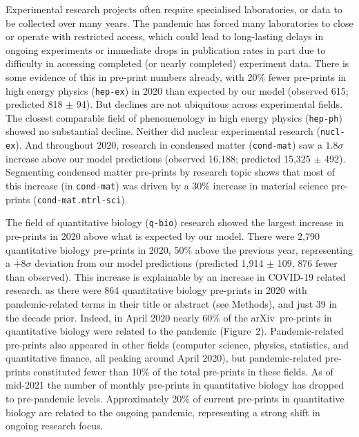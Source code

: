 \documentclass[a4paper,12pt]{article}
\newcommand{\arxiv}{arXiv}
\renewcommand*{\thefootnote}{\arabic{footnote}}
\begin{document}
Experimental research projects often require specialised laboratories, or data to be collected over many years. The pandemic has forced many laboratories to close or operate with restricted access\cite{PhysicsWorld,ScienceMag}, which could lead to long-lasting delays in ongoing experiments or immediate drops in publication rates in part due to difficulty in accessing completed (or nearly completed) experiment data. There is some evidence of this in pre-print numbers already, with {20\%} fewer pre-prints in high energy physics (\texttt{hep-ex}) in 2020 than expected by our model (observed 615; predicted 818 $\pm$ 94). But declines are not ubiquitous across experimental fields. The closest comparable field of phenomenology in high energy physics (\texttt{hep-ph}) showed no substantial decline. Neither did nuclear experimental research (\texttt{nucl-ex}). And throughout 2020, research in condensed matter (\texttt{cond-mat}) saw a $1.8\sigma$ increase above our model predictions (observed 16,188; predicted 15,325 $\pm$ 492). 
Segmenting condensed matter pre-prints by research topic shows that most of this increase (in \texttt{cond-mat}) was driven by a 30\% increase in material science pre-prints (\texttt{cond-mat.mtrl-sci}).


The field of quantitative biology (\texttt{q-bio}) research showed the largest increase in pre-prints in 2020 above what is expected by our model. There were {2,790} quantitative biology pre-prints in 2020, {50\%} above the previous year, representing a $+8\sigma$ deviation from our model predictions (predicted 1,914 $\pm$ 109, 876 fewer than observed). This increase is explainable by an increase in COVID-19 related research, as there were 864 quantitative biology pre-prints in 2020 with pandemic-related terms in their title or abstract (see Methods), and just 39 in the decade prior. Indeed, in {April 2020} nearly 60\% of the \arxiv\ pre-prints in quantitative biology were related to the pandemic (Figure~2). Pandemic-related pre-prints also appeared in other fields (computer science, physics, statistics, and quantitative finance, all peaking around {April 2020}), but pandemic-related pre-prints constituted fewer than 10\% of the total pre-prints in these fields. As of mid-2021 the number of monthly pre-prints in quantitative biology has dropped to pre-pandemic levels. Approximately 20\% of current pre-prints in quantitative biology are related to the ongoing pandemic, representing a strong shift in ongoing research focus.
 
\renewcommand{\thefootnote}{$\dagger$} 
 
\end{document}
